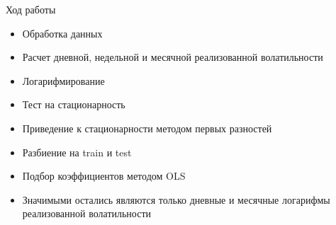 \documentclass[11pt]{beamer} %
\begin{document}
    \begin{frame}{Ход работы}
        \begin{itemize}
            \item Обработка данных
            \item Расчет дневной, недельной и месячной реализованной волатильности
            \item Логарифмирование
            \item Тест на стационарность
            \item Приведение к стационарности методом первых разностей
            \item Разбиение на train и test
            \item Подбор коэффициентов методом OLS
            \item Значимыми остались являются только дневные и месячные логарифмы реализованной волатильности
        \end{itemize}

    \end{frame}
\end{document}
